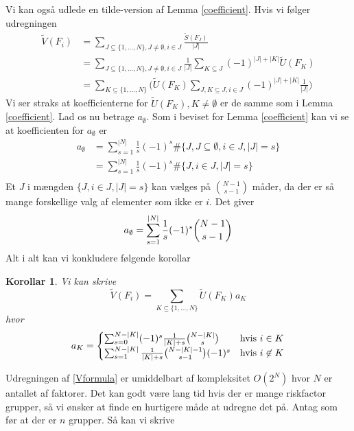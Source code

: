 \documentclass[a4paper, 12pt]{article}
\newtheorem{korollar}{Korollar}
\begin{document}
Vi kan også udlede en tilde-version af Lemma \ref{coefficient}. Hvis vi følger udregningen
\begin{align}
\tilde V(F_i)&=\sum_{J\subseteq\{1,\dots, N\}, J\neq \emptyset, i\in J} \frac{\tilde S(F_J)}{|J|}\nonumber\\
&=\sum_{J\subseteq\{1,\dots, N\}, J\neq \emptyset, i\in J}  \frac{1}{|J|}\sum_{K\subseteq J} (-1)^{|J|+|K|} \tilde U(F_K)\nonumber\\
&=\sum_{K\subseteq \{1, \dots, N\}} \biggl( \tilde U(F_K)\sum_{J, K\subseteq J, i\in J} (-1)^{|J|+|K|} \frac{1}{|J|}\biggr)
\end{align}
Vi ser straks at koefficienterne for $\tilde U(F_K), K\neq \emptyset$ er de samme som i Lemma \ref{coefficient}. Lad os nu betrage $a_{\emptyset}$. Som i beviset for Lemma \ref{coefficient} kan vi se at koefficienten for $a_{\emptyset}$ er 
\begin{align*}
a_{\emptyset}&=\sum_{s=1}^{|N|}\frac{1}{s}(-1)^{s} \#\{J, J\subseteq \emptyset, i\in J, |J|=s \}\\
&=\sum_{s=1}^{|N|}\frac{1}{s}(-1)^{s} \#\{J, i\in J, |J|=s \}\\
\end{align*}
Et $J$ i mængden $\{J, i\in J, |J|=s \}$ kan vælges på ${N-1 \choose s-1}$ måder, da der er så mange forskellige valg af elementer som ikke er $i$. Det giver
\begin{equation}
a_{\emptyset}=\sum_{s=1}^{|N|}\frac{1}{s}(-1)^{s} {N-1 \choose s-1} \\
\end{equation}
Alt i alt kan vi konkludere følgende korollar
\begin{korollar}\label{coefficient_tilde}
Vi kan skrive
\begin{equation}
\tilde V(F_i)=\sum_{K\subseteq \{1, \dots, N\}} \tilde U(F_K)a_K \label{Vformula}
\end{equation}
hvor 
\begin{equation}
a_K=\begin{cases} \sum_{s=0}^{N-|K|} (-1)^s \frac{1}{|K|+s}{N-|K|\choose s} \quad &\textup{hvis } i\in K\\
\sum_{s=1}^{N-|K|}\frac{1}{|K|+s}{N-|K|-1 \choose s-1} (-1)^s &\textup{hvis } i\not\in K
\end{cases}
\end{equation}
\end{korollar}
Udregningen af \eqref{Vformula} er umiddelbart af kompleksitet $O(2^N)$ hvor $N$ er antallet af faktorer. Det kan godt være lang tid hvis der er mange riskfactor grupper, så vi ønsker at finde en hurtigere måde at udregne det på. Antag som før at der er $n$ grupper. Så kan vi skrive
\end{document}
